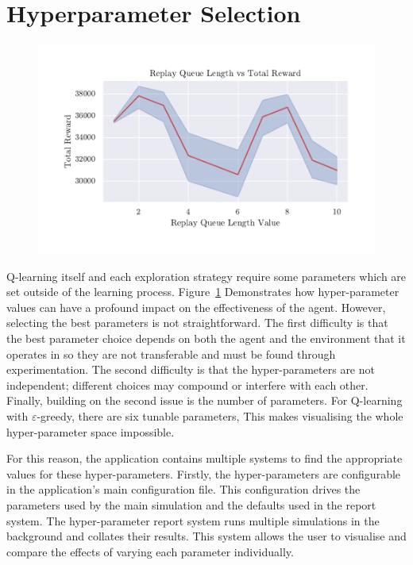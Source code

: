 \documentclass[]{final_report}
\begin{document}
\section{Hyperparameter Selection}

\begin{figure}[H]
  \centering
  
  \includegraphics[trim={0 1cm 0 1cm},clip,width=\textwidth]{hyper-paramiters/replay-queue-length.pdf}
  
  \caption{\label{fig:replay-queue-length}}
\end{figure}

Q-learning itself and each exploration strategy require some parameters which are set outside of the learning process. Figure~\ref{fig:replay-queue-length} Demonstrates how hyper-parameter values can have a profound impact on the effectiveness of the agent. However, selecting the best parameters is not straightforward. The first difficulty is that the best parameter choice depends on both the agent and the environment that it operates in so they are not transferable and must be found through experimentation. The second difficulty is that the hyper-parameters are not independent; different choices may compound or interfere with each other. Finally, building on the second issue is the number of parameters. For Q-learning with $\varepsilon$-greedy, there are six tunable parameters, This makes visualising the whole hyper-parameter space impossible. 


For this reason, the application contains multiple systems to find the appropriate values for these hyper-parameters. Firstly, the hyper-parameters are configurable in the application's main configuration file. This configuration drives the parameters used by the main simulation and the defaults used in the report system. The hyper-parameter report system runs multiple simulations in the background and collates their results. This system allows the user to visualise and compare the effects of varying each parameter individually. 
\end{document}
